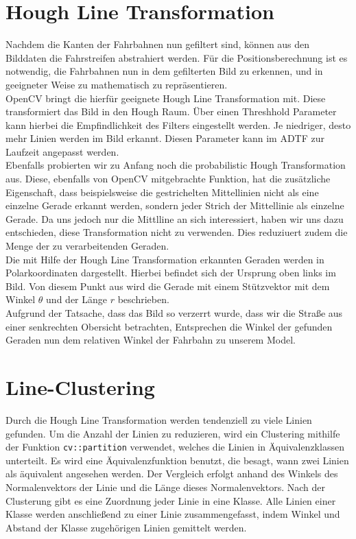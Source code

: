 \documentclass[a4paper,12pt]{report}
\begin{document}
\section{Hough Line Transformation}
	Nachdem die Kanten der Fahrbahnen nun gefiltert sind, können aus den Bilddaten die Fahrstreifen abstrahiert werden. Für die Positionsberechnung ist es notwendig, die Fahrbahnen nun in dem gefilterten Bild zu erkennen, und in geeigneter Weise zu mathematisch zu repräsentieren. \\
	OpenCV bringt die hierfür geeignete Hough Line Transformation mit. Diese transformiert das Bild in den Hough Raum. Über einen Threshhold Parameter kann hierbei die Empfindlichkeit des Filters eingestellt werden. Je niedriger, desto mehr Linien werden im Bild erkannt. Diesen Parameter kann im ADTF zur Laufzeit angepasst werden.\\
	Ebenfalls probierten wir zu Anfang noch die probabilistic Hough Transformation aus. Diese, ebenfalls von OpenCV mitgebrachte Funktion, hat die zusätzliche Eigenschaft, dass beispielsweise die gestrichelten Mittellinien nicht als eine einzelne Gerade erkannt werden, sondern jeder Strich der Mittellinie als einzelne Gerade. Da uns jedoch nur die Mittlline an sich interessiert, haben wir uns dazu entschieden, diese Transformation nicht zu verwenden. Dies reduziuert zudem die Menge der zu verarbeitenden Geraden.\\
	Die mit Hilfe der Hough Line Transformation erkannten Geraden werden in Polarkoordinaten dargestellt. Hierbei befindet sich der Ursprung oben links im Bild. Von diesem Punkt aus wird die Gerade mit einem Stützvektor mit dem Winkel $\theta$ und der Länge $r$ beschrieben.\\
	Aufgrund der Tatsache, dass das Bild so verzerrt wurde, dass wir die Straße aus einer senkrechten Obersicht betrachten, Entsprechen die Winkel der gefunden Geraden nun dem relativen Winkel der Fahrbahn zu unserem Model.
	
\section{Line-Clustering}
	Durch die Hough Line Transformation werden tendenziell zu viele Linien gefunden. Um die Anzahl der Linien zu reduzieren, wird ein Clustering mithilfe der Funktion \texttt{cv::partition} verwendet, welches die Linien in Äquivalenzklassen unterteilt. Es wird eine Äquivalenzfunktion benutzt, die besagt, wann zwei Linien als äquivalent angesehen werden. Der Vergleich erfolgt anhand des Winkels des Normalenvektors der Linie und die Länge dieses Normalenvektors. Nach der Clusterung gibt es eine Zuordnung jeder Linie in eine Klasse. Alle Linien einer Klasse werden anschließend zu einer Linie zusammengefasst, indem Winkel und Abstand der Klasse zugehörigen Linien gemittelt werden.
\end{document}
